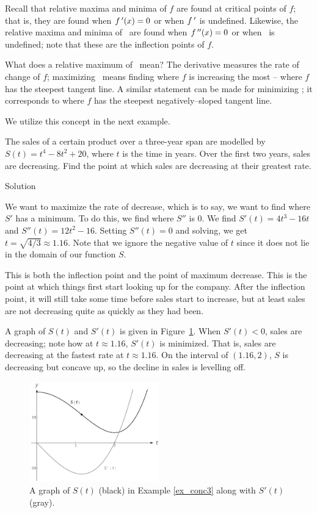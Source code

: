 Recall that relative maxima and minima of $f$ are found at critical points of $f$; that is, they are found when $f\,'(x)=0$ or when $f\,'$ is undefined. Likewise, the relative maxima and minima of \fp\ are found when $f\,''(x)=0$ or when \fpp\ is undefined; note that these are the inflection points of $f$. 

What does a relative maximum of \fp\  mean? The derivative measures the rate of change of $f$; maximizing \fp\ means finding  where $f$ is increasing the most -- where $f$ has the steepest tangent line. A similar statement can be made for minimizing \fp; it corresponds to where $f$ has the steepest negatively--sloped tangent line.

We utilize this concept in the next example.

\begin{example}\label{ex_conc3}
The sales of a certain product over a three-year span are modelled by $S(t)= t^4-8t^2+20$, where $t$ is the time in years.  Over the first two years, sales are decreasing.  Find the point at which sales are decreasing at their greatest rate.

Solution 


We want to maximize the rate of decrease, which is to say, we want to find where $S'$ has a minimum.  To do this, we find where $S''$ is 0.  We find $S'(t)=4t^3-16t$ and $S''(t)=12t^2-16$.  Setting $S''(t)=0$ and solving, we get $t=\sqrt{4/3}\approx 1.16$. Note that we ignore the negative value of $t$ since it does not lie in the domain of our function $S$.

This is both the inflection point and the point of maximum decrease.  This is the point at which things first start looking up for the company.  After the inflection point, it will still take some time before sales start to increase, but at least sales are not decreasing quite as quickly as they had been.

A graph of $S(t)$ and $S'(t)$ is given in Figure~\ref{fig_behaviour_20}. When $S'(t)<0$, sales are decreasing; note how at $t\approx 1.16$, $S'(t)$ is minimized. That is, sales are decreasing at the fastest rate at $t\approx 1.16$.  On the interval of $(1.16,2)$, $S$ is decreasing but concave up, so the decline in sales is levelling off.

\begin{figure}[H]
	\begin{center}
			\includegraphics[width=0.5\textwidth]{fig_behaviour_20}
	\caption{A graph of $S(t)$ (black) in Example \ref{ex_conc3} along with $S'(t)$ (gray).}
	\label{fig_behaviour_20}
	\end{center}
\end{figure}


\end{example}
